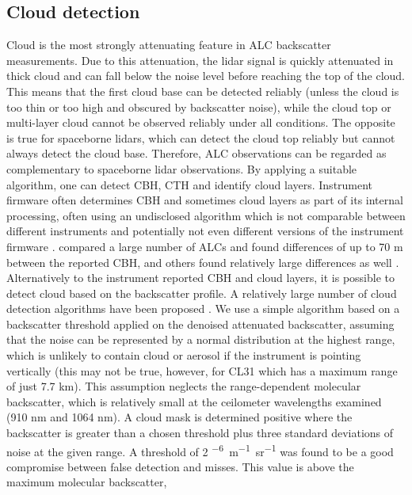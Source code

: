 \subsection{Cloud detection}
\label{sec:3:cloud-detection}

Cloud is the most strongly attenuating feature in ALC backscatter measurements.
Due to this attenuation, the lidar signal is quickly
attenuated in thick cloud and can fall below the noise level before
reaching the top of the cloud. This means that the first cloud base can be 
detected reliably (unless the cloud is too thin or too high and obscured by backscatter noise), while the cloud top or multi-layer cloud cannot be observed reliably under all conditions. The opposite is true for spaceborne lidars, which can detect the cloud top
reliably but cannot always detect the cloud base. Therefore, ALC observations can be regarded
as complementary to spaceborne lidar observations.
By applying a suitable algorithm, one can detect CBH, CTH and identify cloud layers. Instrument firmware
often determines CBH and sometimes cloud layers as part of its internal
processing, often using an undisclosed algorithm which is not comparable
between different instruments and potentially not even different versions
of the instrument firmware \citep{kotthaus2016}. \cite{mattis2016} compared a large
number of ALCs and found differences of up to 70 m between the reported CBH,
and others found relatively large differences as well \citep{liu2015a,silber2018}.
Alternatively to the instrument reported CBH and cloud layers, it is possible
to detect cloud based on the backscatter profile. A relatively large number of
cloud detection algorithms have been proposed
\citep{wang2001,morille2007,martucci2010,tricht2014,silber2018,cromwell2019}.
We use a simple algorithm based on a backscatter threshold applied
on the denoised attenuated backscatter, assuming that the noise can be
represented by a normal distribution at the highest range, which is unlikely
to contain cloud or aerosol if the instrument is pointing vertically
(this may not be true, however, for CL31 which has a maximum range of just 7.7 km).
This assumption neglects the range-dependent molecular backscatter, which is
relatively small at the ceilometer wavelengths examined (910 nm and 1064 nm).
A cloud mask is determined positive where the backscatter is greater than a
chosen threshold plus three standard deviations of noise at the given range. A threshold of
2 \unit{^{-6}m^{-1}sr^{-1}} was found to be a good compromise between false detection
and misses. This value is above the maximum molecular backscatter,
